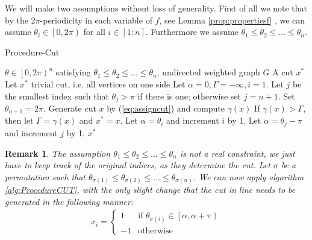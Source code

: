 \documentclass[12pt,a4paper]{article}
\theoremstyle{mythm}
\newtheorem*{rem}{Remark}
\begin{document}
We will make two assumptions without loss of generality. 
First of all we note that by the $ 2\pi $-periodicity in each variable of $ f $, see Lemma \ref{prop:propertiesf} , we can assume $ \theta_i \in \left[ 0,2\pi \right)  $ for all $ i
\in \left[ 1:n \right]  $.
Furthermore we assume $ \theta_1 \leq \theta_2 \leq \dots \leq \theta_n  $.
\begin{algorithm}
\caption{Procedure-Cut}
\label{alg:ProcedureCUT} 
\begin{algorithmic}[1]
\Require $ \theta \in \left[ 0, 2 \pi  \right) ^{ n }   $ satisfying $ \theta_1 \leq \theta_2 \leq \dots \leq \theta_n    $, undirected weighted graph $ G $
\Ensure A cut $ x^* $
\State Let $ x^* $ trivial cut, i.e. all vertices on one side
\State Let $ \alpha =0, \Gamma = -\infty , i =1 $. Let $ j $ be the smallest index such that $ \theta_j > \pi $ if there is one; otherwise set $ j = n+1 $. Set $ \theta _{ n+1
} = 2\pi $.
\While{ $ \alpha < \pi $}
\State Generate cut $ x $ by (\ref{eq:assigncut}) and compute $ \gamma (x) $
\label{gencut} 
\State If $ \gamma (x) > \Gamma $, then let $ \Gamma = \gamma (x) $ and $ x^* = x $.
  \State Let $ \alpha = \theta_i $ and increment $ i $ by 1.
\Else 
\State Let $ \alpha = \theta_j - \pi $ and increment $ j $ by 1.
\EndIf
\EndWhile
\State \Return $ x ^{ * }  $
\end{algorithmic}
\end{algorithm}
\begin{rem}
The assumption $ \theta_1 \leq \theta_2 \leq \dots \leq \theta_n  $ is not a real constraint, we just have to keep track of the original indices, as they determine the cut.
Let $ \sigma $ be a permutation such that $ \theta _{ \sigma (1) } \leq \theta _{ \sigma (2) } \leq \dots \leq \theta _{ \sigma (n) }  $. 
We can now apply algorithm \ref{alg:ProcedureCUT}, with the only slight change that the cut in line  needs to be generated in the following manner:
\begin{align*}
x_i = \begin{cases}
1 & \text{if } \theta _{ \sigma (i) } \in \left[ \alpha, \alpha + \pi  \right)  \\
-1 & \text{otherwise} 
\end{cases}
\end{align*} 
\end{rem} 
\end{document}

